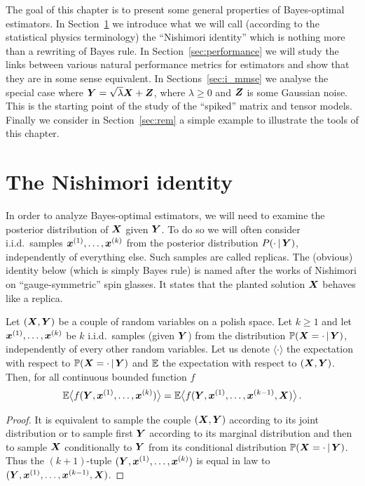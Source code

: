 \documentclass[12pt,nocut]{article}
\begin{document}
The goal of this chapter is to present some general properties of Bayes-optimal estimators. In Section~\ref{sec:nishimori} we introduce what we will call (according to the statistical physics terminology) the ``Nishimori identity'' which is nothing more than a rewriting of Bayes rule.
In Section~\ref{sec:performance} we will study the links between various natural performance metrics for estimators and show that they are in some sense equivalent.
In Sections~\ref{sec:i_mmse} we analyse the special case where ${\boldsymbol Y} = \sqrt{\lambda}{\boldsymbol X} + {\boldsymbol Z}$, where $\lambda \geq 0$ and ${\boldsymbol Z}$ is some Gaussian noise. This is the starting point of the study of the ``spiked'' matrix and tensor models. Finally we consider in Section~\ref{sec:rem} a simple example to illustrate the tools of this chapter.

\section{The Nishimori identity}\label{sec:nishimori}

In order to analyze Bayes-optimal estimators, we will need to examine the posterior distribution of ${\boldsymbol X}$ given ${\boldsymbol Y}$.
To do so we will often consider i.i.d.\ samples ${\boldsymbol x}^{(1)}, \dots, {\boldsymbol x}^{(k)}$ from the posterior distribution $P( \cdot \, | \, {\boldsymbol Y} )$, independently of everything else. Such samples are called replicas. The (obvious) identity below (which is simply Bayes rule)
is named after the works of Nishimori \cite{nishimori1980exact,nishimori1981internal} on ``gauge-symmetric'' spin glasses.
It states that the planted solution ${\boldsymbol X}$ behaves like a replica.

\begin{proposition} \label{prop:nishimori}
	Let $({\boldsymbol X},{\boldsymbol Y})$ be a couple of random variables on a polish space. Let $k \geq 1$ and let ${\boldsymbol x}^{(1)}, \dots, {\boldsymbol x}^{(k)}$ be $k$ i.i.d.\ samples (given ${\boldsymbol Y}$) from the distribution $\mathbb{P}({\boldsymbol X}=\cdot \, | \, {\boldsymbol Y})$, independently of every other random variables. Let us denote $\langle \cdot \rangle$ the expectation with respect to $\mathbb{P}({\boldsymbol X}=\cdot \, | \, {\boldsymbol Y})$ and $\mathbb{E}$ the expectation with respect to $({\boldsymbol X},{\boldsymbol Y})$. Then, for all continuous bounded function $f$
	$$
	\mathbb{E} \big\langle f({\boldsymbol Y},{\boldsymbol x}^{(1)}, \dots, {\boldsymbol x}^{(k)}) \big\rangle
	=
	\mathbb{E} \big\langle f({\boldsymbol Y},{\boldsymbol x}^{(1)}, \dots, {\boldsymbol x}^{(k-1)}, {\boldsymbol X}) \big\rangle\,.
	$$
\end{proposition}
\begin{proof}
It is equivalent to sample the couple $({\boldsymbol X},{\boldsymbol Y})$ according to its joint distribution or to sample first ${\boldsymbol Y}$ according to its marginal distribution and then to sample ${\boldsymbol X}$ conditionally to ${\boldsymbol Y}$ from its conditional distribution $\mathbb{P}({\boldsymbol X}=\cdot \,|\,{\boldsymbol Y})$. Thus the $(k+1)$-tuple $({\boldsymbol Y},{\boldsymbol x}^{(1)}, \dots,{\boldsymbol x}^{(k)})$ is equal in law to $({\boldsymbol Y},{\boldsymbol x}^{(1)},\dots,{\boldsymbol x}^{(k-1)},{\boldsymbol X})$.
\end{proof}
\end{document}
